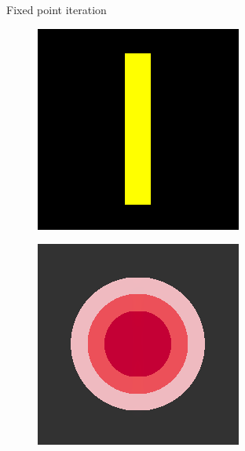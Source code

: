 \documentclass[xcolor=dvipsnames, xetex,serif]{beamer}
\begin{document}
\begin{frame}
\begin{figure}[H]
\begin{subfigure}{0.15\linewidth}
            \end{subfigure}
            \caption{Fixed point iteration }
        \end{figure}
        \begin{figure}[H]
            \centering
            \begin{subfigure}{0.15\linewidth}
                \centering
                \includegraphics[width=0.9\linewidth]{images/result_ex1/splitbergman01.png}
            \end{subfigure}
            \begin{subfigure}{0.15\linewidth}
                \centering
                \includegraphics[width=0.9\linewidth]{images/result_ex1/splitbergman02.png}

\end{subfigure}
\end{figure}
\end{frame}
\end{document}
